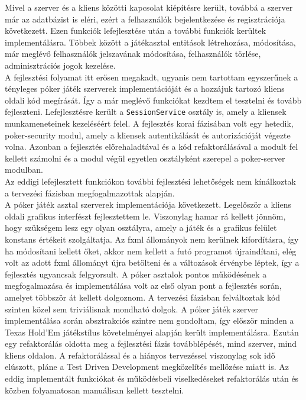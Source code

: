 Mivel a szerver és a kliens közötti kapcsolat kiépítésre került, továbbá a szerver már az adatbázist is eléri, ezért a felhasználók bejelentkezése és regisztrációja következett. Ezen funkciók lefejlesztése után a további funkciók kerültek implementálásra. Többek között a játékasztal entitások létrehozása, módosítása, már meglévő felhasználók jelszavának módosítása, felhasználók törlése, adminisztrációs jogok kezelése. \\
A fejlesztési folyamat itt erősen megakadt, ugyanis nem tartottam egyszerűnek a tényleges póker játék szerverek implementációját és a hozzájuk tartozó kliens oldali kód megírását. Így a már meglévő funkciókat kezdtem el tesztelni és tovább fejleszteni. Lefejlesztésre került a \texttt{SessionService} osztály is, amely a kliensek munkameneteinek kezeléséért felel. A fejlesztés korai fázisában volt egy hetedik, poker-security modul, amely a kliensek autentikálását és autorizációját végezte volna. Azonban a fejlesztés előrehaladtával és a kód refaktorálásával a modult fel kellett számolni és a modul végül egyetlen osztályként szerepel a poker-server modulban. \\
Az eddigi lefejlesztett funkciókon további fejlesztési lehetőségek nem kínálkoztak a tervezési fázisban megfogalmazottak alapján. \\ 
A póker játék asztal szerverek implementációja következett. Legelőször a kliens oldali grafikus interfészt fejlesztettem le. Viszonylag hamar rá kellett jönnöm, hogy szükségem lesz egy olyan osztályra, amely a játék és a grafikus felület konstans értékeit szolgáltatja. Az fxml állományok nem kerülnek kifordításra, így ha módosítani kellett őket, akkor nem kellett a futó programot újraindítani, elég volt az adott fxml állományt újra betölteni és a változások érvénybe léptek, így a fejlesztés ugyancsak felgyorsult. A póker asztalok pontos működésének a megfogalmazása és implementálása volt az első olyan pont a fejlesztés során, amelyet többször át kellett dolgoznom. A tervezési fázisban felváltoztak kód szinten közel sem triviálisnak mondható dolgok. A póker játék szerver implementálása során absztrakciós szintre nem gondoltam, így először minden a Texas Hold'Em játékstílus követelményei alapján került implementálásra. Ezután egy refaktorálás oldotta meg a fejlesztési fázis továbblépését, mind szerver, mind kliens oldalon. A refaktorálással és a hiányos tervezéssel viszonylag sok idő elúszott, pláne a Test Driven Development megközelítés mellőzése miatt is. Az eddig implementált funkciókat és működésbeli viselkedéseket refaktorálás után és közben folyamatosan manuálisan kellett tesztelni. \\
